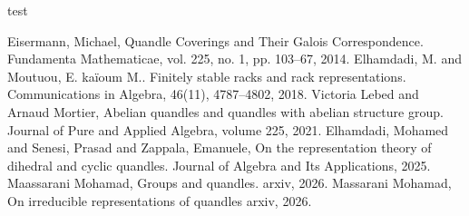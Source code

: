 \documentclass[12pt, reqno]{amsart}
\begin{document}
\begin{thebibliography}{test}

Eisermann, Michael, \newblock Quandle Coverings and Their Galois Correspondence. \newblock Fundamenta Mathematicae, vol. 225, no. 1, pp. 103–67,  2014.
Elhamdadi, M. and Moutuou, E. kaïoum M.. \newblock Finitely stable racks and rack representations. \newblock  Communications in Algebra, 46(11), 4787–4802, 2018.
Victoria Lebed and Arnaud Mortier, \newblock Abelian quandles and quandles with abelian structure group. \newblock Journal of Pure and Applied Algebra, volume 225, 2021.
\newblock Elhamdadi, Mohamed and Senesi, Prasad and Zappala, Emanuele, \newblock On the representation theory of dihedral and cyclic quandles. \newblock Journal of Algebra and Its Applications, 2025.
Maassarani Mohamad, \newblock Groups and quandles. \newblock arxiv, 2026.
Massarani Mohamad, \newblock On irreducible representations of quandles \newblock arxiv, 2026.



 



\end{thebibliography}


 


 
\end{document}
